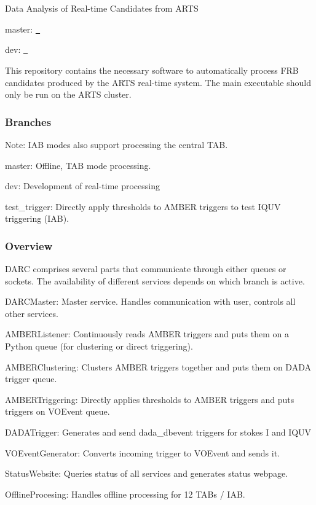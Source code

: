 Data Analysis of Real-\/time Candidates from A\+R\+TS

master\+: \href{https://travis-ci.com/loostrum/darc}{\texttt{ }}

dev\+: \href{https://travis-ci.com/loostrum/darc}{\texttt{ }}

This repository contains the necessary software to automatically process F\+RB candidates produced by the A\+R\+TS real-\/time system. The main executable should only be run on the A\+R\+TS cluster.

\subsubsection*{Branches}

Note\+: I\+AB modes also support processing the central T\+AB.
\begin{DoxyItemize}
\item master\+: Offline, T\+AB mode processing.
\item dev\+: Development of real-\/time processing
\item test\+\_\+trigger\+: Directly apply thresholds to A\+M\+B\+ER triggers to test I\+Q\+UV triggering (I\+AB).
\end{DoxyItemize}

\subsubsection*{Overview}

D\+A\+RC comprises several parts that communicate through either queues or sockets. The availability of different services depends on which branch is active.


\begin{DoxyItemize}
\item D\+A\+R\+C\+Master\+: Master service. Handles communication with user, controls all other services.
\item A\+M\+B\+E\+R\+Listener\+: Continuously reads A\+M\+B\+ER triggers and puts them on a Python queue (for clustering or direct triggering).
\item A\+M\+B\+E\+R\+Clustering\+: Clusters A\+M\+B\+ER triggers together and puts them on D\+A\+DA trigger queue.
\item A\+M\+B\+E\+R\+Triggering\+: Directly applies thresholds to A\+M\+B\+ER triggers and puts triggers on V\+O\+Event queue.
\item D\+A\+D\+A\+Trigger\+: Generates and send dada\+\_\+dbevent triggers for stokes I and I\+Q\+UV
\item V\+O\+Event\+Generator\+: Converts incoming trigger to V\+O\+Event and sends it.
\item Status\+Website\+: Queries status of all services and generates status webpage.
\item Offline\+Procesing\+: Handles offline processing for 12 T\+A\+Bs / I\+AB.
\end{DoxyItemize}

